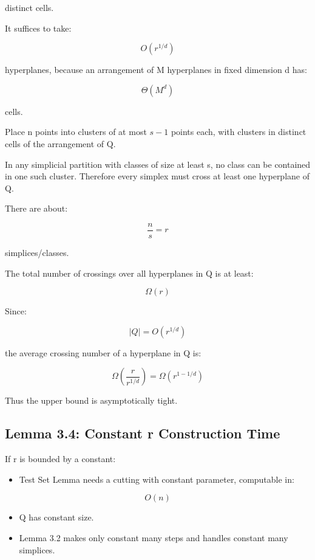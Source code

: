 \documentclass[
  11pt,
]{article}
\providecommand{\tightlist}{%
  \setlength{\itemsep}{0pt}\setlength{\parskip}{0pt}}
\begin{document}
distinct cells.

It suffices to take:

\[
O(r^{1/d})
\]

hyperplanes, because an arrangement of M hyperplanes in fixed dimension
d has:

\[
\Theta(M^d)
\]

cells.

Place n points into clusters of at most \(s-1\) points each, with
clusters in distinct cells of the arrangement of Q.

In any simplicial partition with classes of size at least s, no class
can be contained in one such cluster. Therefore every simplex must cross
at least one hyperplane of Q.

There are about:

\[
\frac{n}{s}=r
\]

simplices/classes.

The total number of crossings over all hyperplanes in Q is at least:

\[
\Omega(r)
\]

Since:

\[
|Q|=O(r^{1/d})
\]

the average crossing number of a hyperplane in Q is:

\[
\Omega\left(\frac{r}{r^{1/d}}\right) = \Omega(r^{1-1/d})
\]

Thus the upper bound is asymptotically tight.

\hypertarget{lemma-3.4-constant-r-construction-time}{%
\subsection{Lemma 3.4: Constant r Construction
Time}\label{lemma-3.4-constant-r-construction-time}}

If r is bounded by a constant:

\begin{itemize}
\tightlist
\item
  Test Set Lemma needs a cutting with constant parameter, computable in:
\end{itemize}

\[
O(n)
\]

\begin{itemize}
\tightlist
\item
  Q has constant size.
\item
  Lemma 3.2 makes only constant many steps and handles constant many
  simplices.
\end{itemize}
\end{document}

